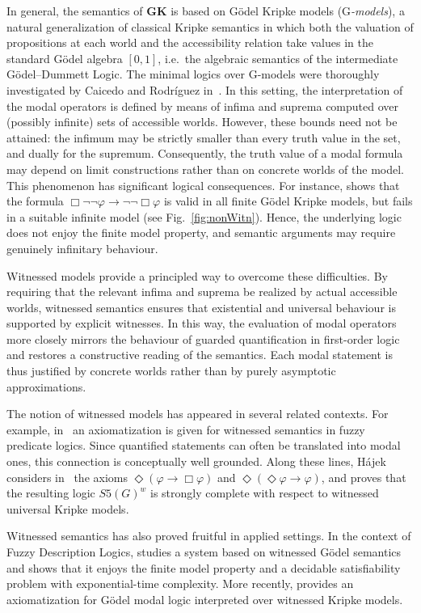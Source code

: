 \documentclass[copyright,creativecommons]{eptcs}
\newcommand{\GKL}{\mathbf{GK}}
\newcommand{\GM}{\mbox{$\mathrm{G}$}}
\begin{document}
In general, the semantics of $\GKL$ is based on G\"odel Kripke models
(\emph{\GM-models}), a natural generalization of classical Kripke
semantics in which both the valuation of propositions at each world
and the accessibility relation take values in the standard G\"odel
algebra $[0,1]$, i.e.\ the algebraic semantics of the intermediate
G\"odel--Dummett Logic. The minimal logics over {\GM-models} were
thoroughly investigated by Caicedo and Rodr\'iguez
in~\cite{CaiRod2010,CaiRod2015}.  In this setting, the interpretation
of the modal operators is defined by means of infima and suprema
computed over (possibly infinite) sets of accessible worlds. However,
these bounds need not be attained: the infimum may be strictly smaller
than every truth value in the set, and dually for the
supremum. Consequently, the truth value of a modal formula may depend
on limit constructions rather than on concrete worlds of the model.
This phenomenon has significant logical consequences. For instance,
\cite{CaiRod2010} shows that the formula $\Box \neg \neg \varphi \to
\neg \neg \Box \varphi$ is valid in all finite G\"odel Kripke models,
but fails in a suitable infinite model (see
Fig.~\ref{fig:nonWitn}). Hence, the underlying logic does not enjoy the
finite model property, and semantic arguments may require genuinely
infinitary behaviour.

Witnessed models provide a principled way to overcome these
difficulties. By requiring that the relevant infima and suprema be
realized by actual accessible worlds, witnessed semantics ensures that
existential and universal behaviour is supported by explicit
witnesses. In this way, the evaluation of modal operators more closely
mirrors the behaviour of guarded quantification in first-order logic
and restores a constructive reading of the semantics. Each modal
statement is thus justified by concrete worlds rather than by purely
asymptotic approximations.

The notion of witnessed models has appeared in several related
contexts. For example, in~\cite{HC2006} an axiomatization is given for
witnessed semantics in fuzzy predicate logics. Since quantified
statements can often be translated into modal ones, this connection is
conceptually well grounded. Along these lines, H\'ajek considers
in~\cite{HajekS5} the axioms $\Diamond(\varphi \to \Box \varphi)$ and
$\Diamond(\Diamond \varphi \to \varphi)$, and proves that the resulting
logic $S5(G)^w$ is strongly complete with respect to witnessed
universal Kripke models.

Witnessed semantics has also proved fruitful in applied settings. In
the context of Fuzzy Description Logics, \cite{BDP2014} studies a
system based on witnessed G\"odel semantics and shows that it enjoys
the finite model property and a decidable satisfiability problem with
exponential-time complexity. More recently, \cite{RV26} provides an
axiomatization for  G\"odel modal logic interpreted over witnessed
Kripke models.
\end{document}
